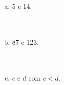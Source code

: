 \documentclass[a4paper,14pt]{article}
\begin{document}
\begin{multicols}{2}
\begin{enumerate}
\begin{enumerate}[a)]
        			\item 5 e 14. \\\\\\
        			\item 87 e 123. \\\\\\
        			\item $c$ e $d$ com $c < d$. \\\\\\
        		\end{enumerate}
        	\end{enumerate}
        	$~$ \\ $~$ \\ $~$ \\ $~$ \\ $~$ \\ $~$ \\ $~$ \\ $~$ \\ $~$ \\ $~$ \\ $~$ \\ $~$ \\ $~$ \\ $~$ \\ $~$ \\ $~$ \\ $~$ \\ $~$ \\ $~$ \\ $~$ \\ $~$ \\ $~$ \\ $~$ \\ $~$ \\ $~$ \\ $~$ \\ $~$ \\ $~$ \\ $~$ \\ $~$ \\ $~$ \\ $~$ \\ $~$ \\ $~$ \\ $~$ \\ $~$ \\ $~$ \\ $~$ \\ $~$ \\ $~$ \\ $~$ \\ $~$ \\ $~$ \\ $~$ \\ $~$ \\ $~$ \\ $~$ \\ $~$ \\ $~$ \\ $~$ \\ $~$
	\end{multicols}
\end{document}
